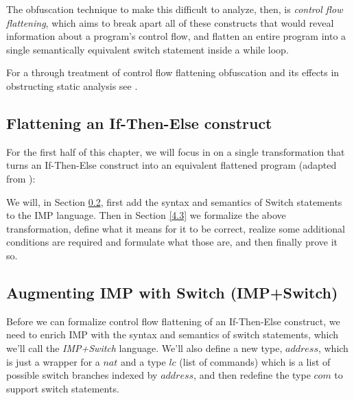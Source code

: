 \documentclass[compsoc,conference,a4paper,10pt,times]{IEEEtran}
\begin{document}
\par The obfuscation technique to make this difficult to analyze, then, is \emph{control flow flattening}, which aims to break apart all of these constructs that would reveal information about a program's control flow, and flatten an entire program into a single semantically equivalent switch statement inside a while loop.

\par For a through treatment of control flow flattening obfuscation and its effects in obstructing static analysis see \cite{Wang}.  

\subsection{Flattening an If-Then-Else construct}
For the first half of this chapter, we will focus in on a single transformation that turns an If-Then-Else construct into an equivalent flattened program (adapted from \cite{Blazy2}):




We will, in Section \ref{4.2}, first add the syntax and semantics of Switch statements to the IMP language.  Then in Section \ref{4.3} we formalize the above transformation, define what it means for it to be correct, realize some additional conditions are required and formulate what those are, and then finally prove it so.


\subsection{Augmenting IMP with Switch (IMP+Switch)}\label{4.2}
Before we can formalize control flow flattening of an If-Then-Else construct, we need to enrich IMP with the syntax and semantics of switch statements, which we'll call the \emph{IMP+Switch} language.  We'll also define a new type, $address$, which is just a wrapper for a $nat$ and a type $lc$ (list of commands) which is a list of possible switch branches indexed by $address$, and then redefine the type $com$ to support switch statements.
\end{document}
